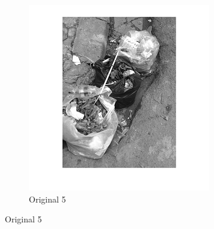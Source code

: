 \begin{center}
\begin{figure}[h]
\begin{subfigure}[b]{0.18\textwidth}
                        \includegraphics[width=\linewidth]{rubbish5.png}
                         \caption{Original 5}
                          \label{fig:original 5}
                \end{subfigure}
      \end{figure}
	\end{center}
\vspace{2cm}

